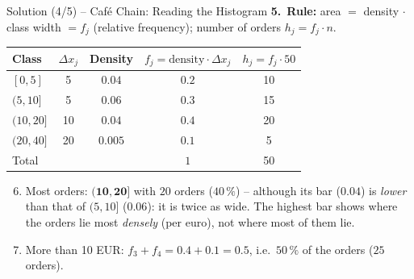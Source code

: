 \documentclass[aspectratio=169,11pt]{beamer}
\begin{document}
\begin{frame}{Solution (4/5) -- Caf\'e Chain: Reading the Histogram}
  \textbf{5.}~\textbf{Rule:} area $=$ density $\cdot$ class width $= f_j$ (relative
  frequency); number of orders $h_j = f_j \cdot n$.
  \begin{center}
    \small
    \renewcommand{\arraystretch}{1.1}
    \begin{tabular}{lcccc}
      \toprule
      Class & $\Delta x_j$ & Density & $f_j = \text{density} \cdot \Delta x_j$ & $h_j = f_j \cdot 50$ \\
      \midrule
      $[0,5]$   & 5  & $0.04$  & $0.2$ & 10 \\
      $(5,10]$  & 5  & $0.06$  & $0.3$ & 15 \\
      $(10,20]$ & 10 & $0.04$  & $0.4$ & 20 \\
      $(20,40]$ & 20 & $0.005$ & $0.1$ & 5 \\
      \midrule
      Total     &    &         & $1$   & 50 \\
      \bottomrule
    \end{tabular}
  \end{center}
  \begin{enumerate}\setcounter{enumi}{5}
    \item Most orders: $\mathbf{(10,20]}$ with $20$ orders ($40\,\%$) -- although
          its bar ($0.04$) is \emph{lower} than that of $(5,10]$ ($0.06$): it is
          twice as wide. The highest bar shows where the orders lie most
          \emph{densely} (per euro), not where most of them lie.
    \item More than 10 EUR: $f_3 + f_4 = 0.4 + 0.1 = \mathbf{0.5}$, i.e.\
          $50\,\%$ of the orders ($25$ orders).
  \end{enumerate}
\end{frame}
\end{document}
